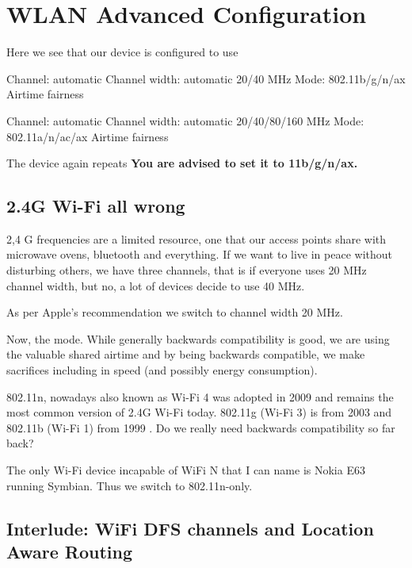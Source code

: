 \documentclass[../wifi-security.tex]{subfiles}
\begin{document}


\section{WLAN Advanced Configuration}

Here we see that our device is configured to use

Channel: automatic
Channel width: automatic 20/40 MHz
Mode: 802.11b/g/n/ax
Airtime fairness

Channel: automatic
Channel width: automatic 20/40/80/160 MHz
Mode: 802.11a/n/ac/ax
Airtime fairness

The device again repeats \textbf{You are advised to set it to 11b/g/n/ax.}

\subsection{2.4G Wi-Fi all wrong}

2,4 G frequencies are a limited resource, one that our access points share with microwave ovens, bluetooth and everything. If we want to live in peace without disturbing others, we have three channels, that is if everyone uses 20 MHz channel width, but no, a lot of devices decide to use 40 MHz.

As per Apple's recommendation we switch to channel width 20 MHz.\autocite{appleap}

Now, the mode. While generally backwards compatibility is good, we are using the valuable shared airtime and by being backwards compatible, we make sacrifices including in speed (and possibly energy consumption). \autocite{doubleedgedbackwards}

802.11n, nowadays also known as Wi-Fi 4 was adopted in 2009 and remains the most common version of 2.4G Wi-Fi today. 802.11g (Wi-Fi 3) is from 2003 and 802.11b (Wi-Fi 1) from 1999 \autocite{wikipediawifi6}. Do we really need backwards compatibility so far back?

The only Wi-Fi device incapable of WiFi N that I can name is Nokia E63 running Symbian. Thus we switch to 802.11n-only.

\subsection{Interlude: WiFi DFS channels and Location Aware Routing}
\end{document}
